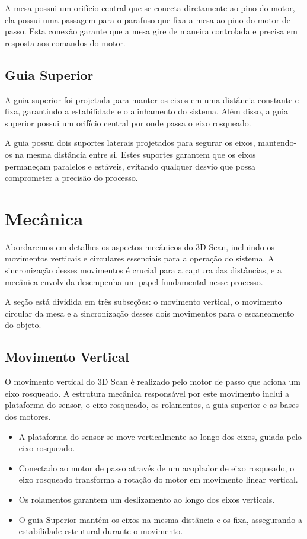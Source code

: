 A mesa possui um orifício central que se conecta diretamente ao pino do motor, ela possui uma passagem para o parafuso que fixa a mesa ao pino do motor de passo. Esta conexão garante que a mesa gire de maneira controlada e precisa em resposta aos comandos do motor.

\subsection{Guia Superior}

A guia superior foi projetada para manter os eixos em uma distância constante e fixa, garantindo a estabilidade e o alinhamento do sistema. Além disso, a guia superior possui um orifício central por onde passa o eixo rosqueado.

A guia possui dois suportes laterais projetados para segurar os eixos, mantendo-os na mesma distância entre si. Estes suportes garantem que os eixos permaneçam paralelos e estáveis, evitando qualquer desvio que possa comprometer a precisão do processo.

\section{Mecânica}

Abordaremos em detalhes os aspectos mecânicos do 3D Scan, incluindo os movimentos verticais e circulares essenciais para a operação do sistema. A sincronização desses movimentos é crucial para a captura das distâncias, e a mecânica envolvida desempenha um papel fundamental nesse processo. 

A seção está dividida em três subseções: o movimento vertical, o movimento circular da mesa e a sincronização desses dois movimentos para o escaneamento do objeto.

\subsection{Movimento Vertical}

O movimento vertical do 3D Scan é realizado pelo motor de passo que aciona um eixo rosqueado. A estrutura mecânica responsável por este movimento inclui a plataforma do sensor, o eixo rosqueado, os rolamentos, a guia superior e as bases dos motores.

\begin{itemize}
    \item A plataforma do sensor se move verticalmente ao longo dos eixos, guiada pelo eixo rosqueado.
    \item Conectado ao motor de passo através de um acoplador de eixo rosqueado, o eixo rosqueado transforma a rotação do motor em movimento linear vertical.
    \item Os rolamentos garantem um deslizamento ao longo dos eixos verticais.
    \item O guia Superior mantém os eixos na mesma distância e os fixa, assegurando a estabilidade estrutural durante o movimento. 
\end{itemize}


